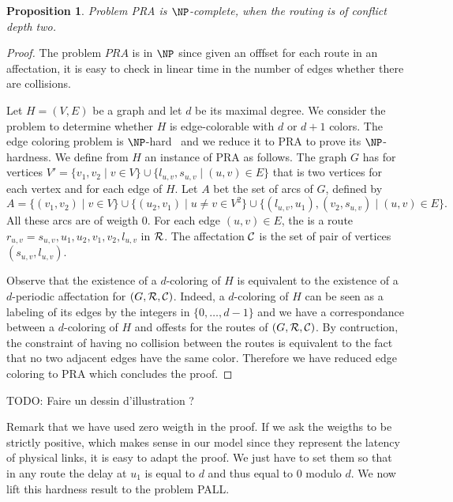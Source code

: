 \documentclass[a4paper,10pt]{article}
\newtheorem{proposition}{Proposition}
\newcommand{\todo}[1]{{\color{red} TODO: {#1}}}
\begin{document}
 \begin{proposition}
Problem PRA is $\NP$-complete, when the routing is of conflict depth two.
\end{proposition}
 \begin{proof}
 The problem $PRA$ is in $\NP$ since given an offfset for each route in an affectation, it is easy to check in linear time in the number of edges whether there are collisions.
 
  Let $H=(V,E)$ be a graph and let $d$ be its maximal degree. We consider the problem to determine whether $H$ is edge-colorable
  with $d$ or $d+1$ colors. The edge coloring problem is $\NP$-hard~\cite{holyer1981np} and we reduce it to PRA to prove its $\NP$-hardness. We define from $H$ an instance of PRA as follows. The graph $G$ has for vertices $V'= \{ v_1, v_2 \mid v \in V  \} \cup \{ l_{u,v}, s_{u,v} \mid (u,v) \in E \}$ that is two vertices for each vertex and for each edge of $H$. 
  Let $A$ bet the set of arcs of $G$, defined by 
  $$A = \{(v_1,v_2) \mid v\in V\} \cup \{(u_2,v_1)\mid u \neq v \in V^2\} \cup \{(l_{u,v},u_1),(v_2,s_{u,v}) \mid (u,v) \in E \}. $$
  All these arcs are of weigth $0$. 
  For each edge $(u,v) \in E$, the is a route $r_{u,v} = s_{u,v},u_1,u_2,v_1,v_2,l_{u,v}$ in ${\cal R}$.  
  The affectation ${\cal C}$ is the set of pair of vertices $(s_{u,v}, l_{u,v})$.
    
  Observe that the existence of a $d$-coloring of $H$ is equivalent to the existence of a $d$-periodic affectation
  for $(G,{\cal R},{\cal C})$. Indeed, a $d$-coloring of $H$ can be seen as a labeling of its edges by the integers
  in $\{0,\dots,d-1\}$ and we have a correspondance between a $d$-coloring of $H$ and offests for the routes of $(G,{\cal R},{\cal C})$.
  By contruction, the constraint of having no collision between the routes is equivalent to the fact that no two adjacent edges have
  the same color. Therefore we have reduced edge coloring to PRA which concludes the proof. 
 \end{proof}
 \todo{Faire un dessin d'illustration ?}
 
 Remark that we have used zero weigth in the proof. If we ask the weigths to be strictly positive, which makes sense in our model since
they represent the latency of physical links, it is easy to adapt the proof. We just have to set them so that in any route the delay at $u_1$ is equal to $d$ and thus equal to $0$ modulo $d$. We now lift this hardness result to the problem PALL.
\end{document}
